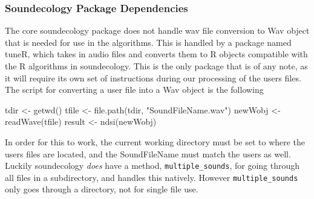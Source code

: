 \subsubsection{Soundecology Package Dependencies}
The core soundecology package does not handle wav file conversion to Wav object that is needed for use in the algorithms. This is handled by a package named tuneR, which takes in audio files and converts them to R objects compatible with the R algorithms in soundecology. This is the only package that is of any note, as it will require its own set of instructions during our processing of the user\textquotesingle s files. The script for converting a user file into a Wav object is the following

\begin{javascriptcode}
  tdir <- getwd()
  tfile <- file.path(tdir, "SoundFileName.wav")
  newWobj <- readWave(tfile)
  result <- ndsi(newWobj)
\end{javascriptcode}

In order for this to work, the current working directory must be set to where the user\textquotesingle s files are located, and the SoundFileName must match the user\textquotesingle s as well. Luckily soundecology \textit{does} have a method, \verb|multiple_sounds|, for going through all files in a subdirectory, and handles this natively. However \verb|multiple_sounds| only goes through a directory, not for single file use.

